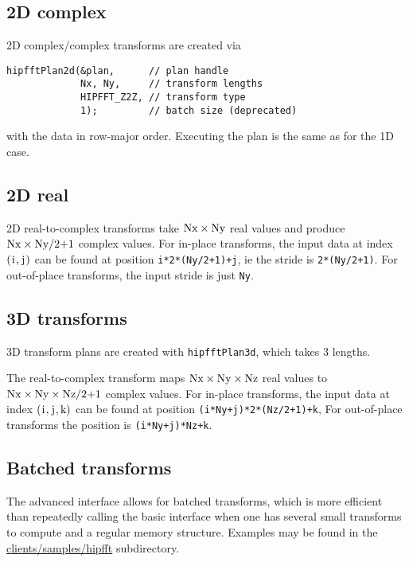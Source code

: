 \documentclass[12pt]{article}
\renewcommand{\(}{\left(}
\renewcommand{\)}{\right)}
\begin{document}
\subsection{2D complex}
2D complex/complex transforms are created via
\begin{lstlisting}
hipfftPlan2d(&plan,      // plan handle
             Nx, Ny,     // transform lengths
             HIPFFT_Z2Z, // transform type 
             1);         // batch size (deprecated)
\end{lstlisting}
with the data in row-major order.  Executing the plan is the same as
for the 1D case.

\subsection{2D real}
2D real-to-complex transforms take
$\text{\lstinline{Nx}}\times{}\text{\lstinline{Ny}}$ real values and
produce $\text{\lstinline{Nx}}\times{}\text{\lstinline{Ny/2+1}}$
complex values.  For in-place transforms, the input data at index
$\(\text{\lstinline{i}},\text{\lstinline{j}}\)$ can be found at
position \lstinline{i*2*(Ny/2+1)+j}, ie the stride is
\lstinline{2*(Ny/2+1)}.  For out-of-place transforms, the input stride
is just \lstinline{Ny}.

\subsection{3D transforms}
3D transform plans are created with \lstinline{hipfftPlan3d}, which
takes 3 lengths.

The real-to-complex transform maps
$\text{\lstinline{Nx}}\times{}\text{\lstinline{Ny}}\times{}\text{\lstinline{Nz}}$
real values to
$\text{\lstinline{Nx}}\times{}\text{\lstinline{Ny}}\times{}\text{\lstinline{Nz/2+1}}$
complex values.  For in-place transforms, the input data at index
$\(\text{\lstinline{i}},\text{\lstinline{j}},\text{\lstinline{k}}\)$
can be found at position \lstinline{(i*Ny+j)*2*(Nz/2+1)+k}, For
out-of-place transforms the position is \lstinline{(i*Ny+j)*Nz+k}.

\subsection{Batched transforms}

The advanced interface allows for batched transforms, which is more
efficient than repeatedly calling the basic interface when one has
several small transforms to compute and a regular memory structure.
Examples may be found in the \url{clients/samples/hipfft}
subdirectory.
\end{document}
